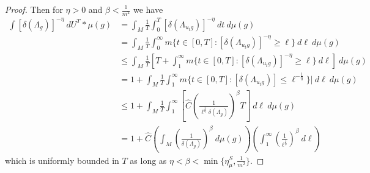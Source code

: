 \documentclass[10pt,reqno]{amsart}
\theoremstyle{Theorem}
\theoremstyle{definition}
\theoremstyle{remark}
\begin{document}
\begin{proof}
Then for $\eta>0$  and $\beta< \frac 1{m^2}$ we have
\begin{align*}
\int  [\delta(\Lambda_{g})]^{-\eta} \ d U^T\ast \mu (g) &=
\int _M \frac{1}{T} \int_{0}^{T} [\delta(\Lambda_{u_t g})]^{-\eta} \ d  t \ d  \mu(g) \\
&= \int _M \frac{1}{T}  \int_{0}^{\infty} m\{t\in [0,T] : [\delta(\Lambda_{u_t g})]^{-\eta} \ge \ell \}   \ d \ell  \ d  \mu(g) \\
&\le
\int _M \frac{1}{T}\left[T+  \int_{1}^{\infty} m\{t\in [0,T] : [\delta(\Lambda_{u_t g})]^{-\eta} \ge \ell \}   \ d \ell\right] \ d  \mu(g) \\
&= 1+
\int _M \frac{1}{T} \int_{1}^{\infty} m\{t\in [0,T] : [\delta(\Lambda_{u_t g})] \le {\ell^{-\frac 1\eta}} \} |  \ d \ell \ d  \mu(g) \\
& \le  1 + \int _M \frac{1}{T}  \int_1^\infty
\left[\hat C\left(\frac {1}{\ell ^{\frac 1\eta} \delta(\Lambda_g)}\right)^{\beta}T\right] \ d \ell
\ d  \mu(g) \\
& =1+  \hat C \left(\int _M
\left(\frac {1}{\delta(\Lambda_g)}\right)^{\beta} \ d  \mu(g)\right)
\left(\int _1 ^\infty \left(\frac {1}{\ell ^{\frac 1\eta}}\right)^{\beta}  \ d \ell
        \right)
\end{align*}
which is uniformly bounded in $T$ as long as $\eta<\beta< \min\{\eta_\mu^S,  \frac 1{m^2}\} $.
\end{proof}
\end{document}

